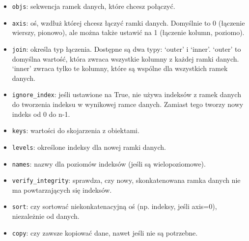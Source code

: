 \documentclass[
  polish,
  letterpaper,
  DIV=11,
  numbers=noendperiod]{scrreprt}
\providecommand{\tightlist}{%
  \setlength{\itemsep}{0pt}\setlength{\parskip}{0pt}}
\begin{document}
\begin{itemize}
\tightlist
\item
  \texttt{objs}: sekwencja ramek danych, które chcesz połączyć.
\item
  \texttt{axis}: oś, wzdłuż której chcesz łączyć ramki danych. Domyślnie
  to 0 (łączenie wierszy, pionowo), ale można także ustawić na 1
  (łączenie kolumn, poziomo).
\item
  \texttt{join}: określa typ łączenia. Dostępne są dwa typy: `outer' i
  `inner'. `outer' to domyślna wartość, która zwraca wszystkie kolumny z
  każdej ramki danych. `inner' zwraca tylko te kolumny, które są wspólne
  dla wszystkich ramek danych.
\item
  \texttt{ignore\_index}: jeśli ustawione na True, nie używa indeksów z
  ramek danych do tworzenia indeksu w wynikowej ramce danych. Zamiast
  tego tworzy nowy indeks od 0 do n-1.
\item
  \texttt{keys}: wartości do skojarzenia z obiektami.
\item
  \texttt{levels}: określone indeksy dla nowej ramki danych.
\item
  \texttt{names}: nazwy dla poziomów indeksów (jeśli są wielopoziomowe).
\item
  \texttt{verify\_integrity}: sprawdza, czy nowy, skonkatenowana ramka
  danych nie ma powtarzających się indeksów.
\item
  \texttt{sort}: czy sortować niekonkatenacyjną oś (np. indeksy, jeśli
  axis=0), niezależnie od danych.
\item
  \texttt{copy}: czy zawsze kopiować dane, nawet jeśli nie są potrzebne.
\end{itemize}
\end{document}
